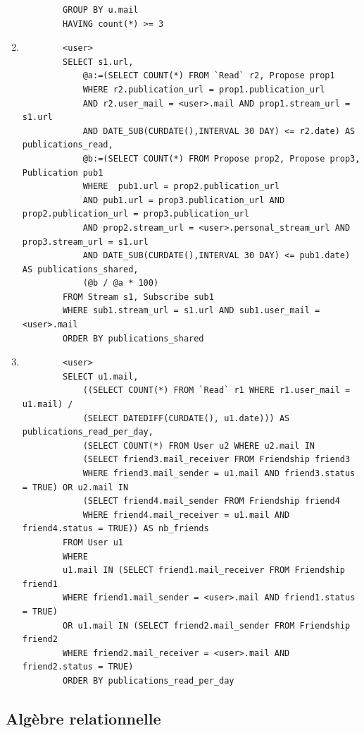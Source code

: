 \documentclass[a4paper,10pt]{article}
\begin{document}
\begin{enumerate}
\begin{verbatim}
		GROUP BY u.mail
		HAVING count(*) >= 3
             \end{verbatim}
	    \item 
	    \begin{verbatim}
		<user>
		SELECT s1.url, 
		    @a:=(SELECT COUNT(*) FROM `Read` r2, Propose prop1 
		    WHERE r2.publication_url = prop1.publication_url 
		    AND r2.user_mail = <user>.mail AND prop1.stream_url = s1.url 
		    AND DATE_SUB(CURDATE(),INTERVAL 30 DAY) <= r2.date) AS publications_read,
		    @b:=(SELECT COUNT(*) FROM Propose prop2, Propose prop3, Publication pub1 
		    WHERE  pub1.url = prop2.publication_url 
		    AND pub1.url = prop3.publication_url AND prop2.publication_url = prop3.publication_url 
		    AND prop2.stream_url = <user>.personal_stream_url AND prop3.stream_url = s1.url 
		    AND DATE_SUB(CURDATE(),INTERVAL 30 DAY) <= pub1.date) AS publications_shared,
		    (@b / @a * 100)
		FROM Stream s1, Subscribe sub1
		WHERE sub1.stream_url = s1.url AND sub1.user_mail = <user>.mail
		ORDER BY publications_shared
             \end{verbatim}
	    \item 
	    \begin{verbatim}
		<user>
		SELECT u1.mail,
		    ((SELECT COUNT(*) FROM `Read` r1 WHERE r1.user_mail = u1.mail) / 
		    (SELECT DATEDIFF(CURDATE(), u1.date))) AS publications_read_per_day,
		    (SELECT COUNT(*) FROM User u2 WHERE u2.mail IN 
		    (SELECT friend3.mail_receiver FROM Friendship friend3 
		    WHERE friend3.mail_sender = u1.mail AND friend3.status = TRUE) OR u2.mail IN 
		    (SELECT friend4.mail_sender FROM Friendship friend4 
		    WHERE friend4.mail_receiver = u1.mail AND friend4.status = TRUE)) AS nb_friends
		FROM User u1
		WHERE 
		u1.mail IN (SELECT friend1.mail_receiver FROM Friendship friend1 
		WHERE friend1.mail_sender = <user>.mail AND friend1.status = TRUE)
		OR u1.mail IN (SELECT friend2.mail_sender FROM Friendship friend2 
		WHERE friend2.mail_receiver = <user>.mail AND friend2.status = TRUE)
		ORDER BY publications_read_per_day
             \end{verbatim}
	\end{enumerate}

\subsection{Algèbre relationnelle}

\end{document}
